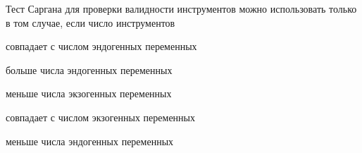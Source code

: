 
\begin{question}
Тест Саргана для проверки валидности инструментов можно использовать
только в том случае, если число инструментов
\begin{answerlist}
  \item совпадает с числом эндогенных переменных
  \item больше числа эндогенных переменных
  \item меньше числа экзогенных переменных
  \item совпадает с числом экзогенных переменных
  \item меньше числа эндогенных переменных
\end{answerlist}
\end{question}


